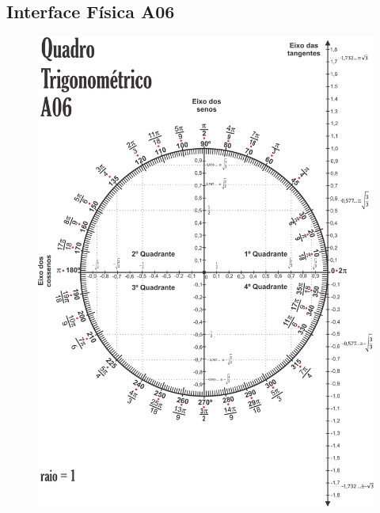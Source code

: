 \subsection{Interface Física A06}\label{subsection:atividade3_A06}
\begin{figure}[htb]
	\centering
	\includegraphics[width=0.9\linewidth]{chapters/appendixLesson/Interface_A06.png}
\end{figure}